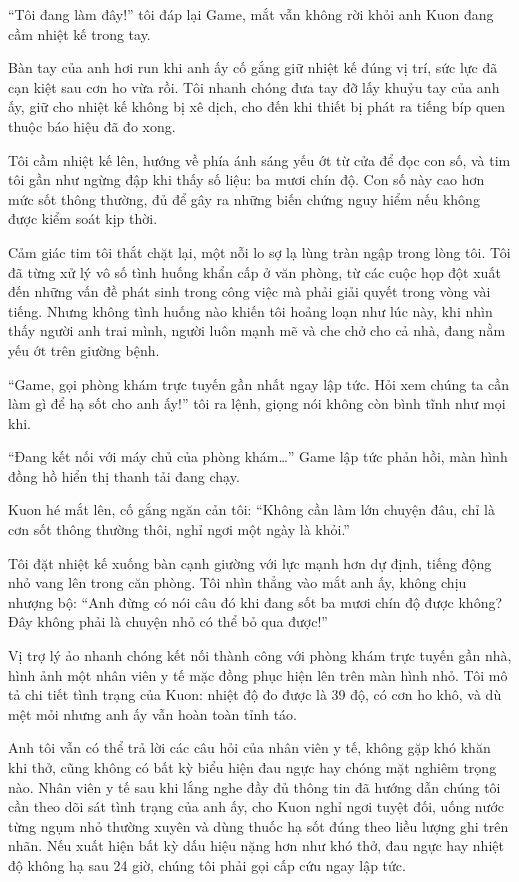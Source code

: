 \documentclass[../main.tex]{subfiles}
\begin{document}
``Tôi đang làm đây!'' tôi đáp lại Game, mắt vẫn không rời khỏi anh Kuon đang cầm nhiệt kế trong tay.

Bàn tay của anh hơi run khi anh ấy cố gắng giữ nhiệt kế đúng vị trí, sức lực đã cạn kiệt sau cơn ho vừa rồi. Tôi nhanh chóng đưa tay đỡ lấy khuỷu tay của anh ấy, giữ cho nhiệt kế không bị xê dịch, cho đến khi thiết bị phát ra tiếng bíp quen thuộc báo hiệu đã đo xong.

Tôi cầm nhiệt kế lên, hướng về phía ánh sáng yếu ớt từ cửa để đọc con số, và tim tôi gần như ngừng đập khi thấy số liệu: ba mươi chín độ. Con số này cao hơn mức sốt thông thường, đủ để gây ra những biến chứng nguy hiểm nếu không được kiểm soát kịp thời.

Cảm giác tim tôi thắt chặt lại, một nỗi lo sợ lạ lùng tràn ngập trong lòng tôi. Tôi đã từng xử lý vô số tình huống khẩn cấp ở văn phòng, từ các cuộc họp đột xuất đến những vấn đề phát sinh trong công việc mà phải giải quyết trong vòng vài tiếng. Nhưng không tình huống nào khiến tôi hoảng loạn như lúc này, khi nhìn thấy người anh trai mình, người luôn mạnh mẽ và che chở cho cả nhà, đang nằm yếu ớt trên giường bệnh.

``Game, gọi phòng khám trực tuyến gần nhất ngay lập tức. Hỏi xem chúng ta cần làm gì để hạ sốt cho anh ấy!'' tôi ra lệnh, giọng nói không còn bình tĩnh như mọi khi.

``Đang kết nối với máy chủ của phòng khám\dots'' Game lập tức phản hồi, màn hình đồng hồ hiển thị thanh tải đang chạy.

Kuon hé mắt lên, cố gắng ngăn cản tôi: ``Không cần làm lớn chuyện đâu, chỉ là cơn sốt thông thường thôi, nghỉ ngơi một ngày là khỏi.''

Tôi đặt nhiệt kế xuống bàn cạnh giường với lực mạnh hơn dự định, tiếng động nhỏ vang lên trong căn phòng. Tôi nhìn thẳng vào mắt anh ấy, không chịu nhượng bộ: ``Anh đừng có nói câu đó khi đang sốt ba mươi chín độ được không? Đây không phải là chuyện nhỏ có thể bỏ qua được!''

Vị trợ lý ảo nhanh chóng kết nối thành công với phòng khám trực tuyến gần nhà, hình ảnh một nhân viên y tế mặc đồng phục hiện lên trên màn hình nhỏ. Tôi mô tả chi tiết tình trạng của Kuon: nhiệt độ đo được là 39 độ, có cơn ho khô, và dù mệt mỏi nhưng anh ấy vẫn hoàn toàn tỉnh táo.

Anh tôi vẫn có thể trả lời các câu hỏi của nhân viên y tế, không gặp khó khăn khi thở, cũng không có bất kỳ biểu hiện đau ngực hay chóng mặt nghiêm trọng nào. Nhân viên y tế sau khi lắng nghe đầy đủ thông tin đã hướng dẫn chúng tôi cần theo dõi sát tình trạng của anh ấy, cho Kuon nghỉ ngơi tuyệt đối, uống nước từng ngụm nhỏ thường xuyên và dùng thuốc hạ sốt đúng theo liều lượng ghi trên nhãn. Nếu xuất hiện bất kỳ dấu hiệu nặng hơn như khó thở, đau ngực hay nhiệt độ không hạ sau 24 giờ, chúng tôi phải gọi cấp cứu ngay lập tức.
\end{document}
